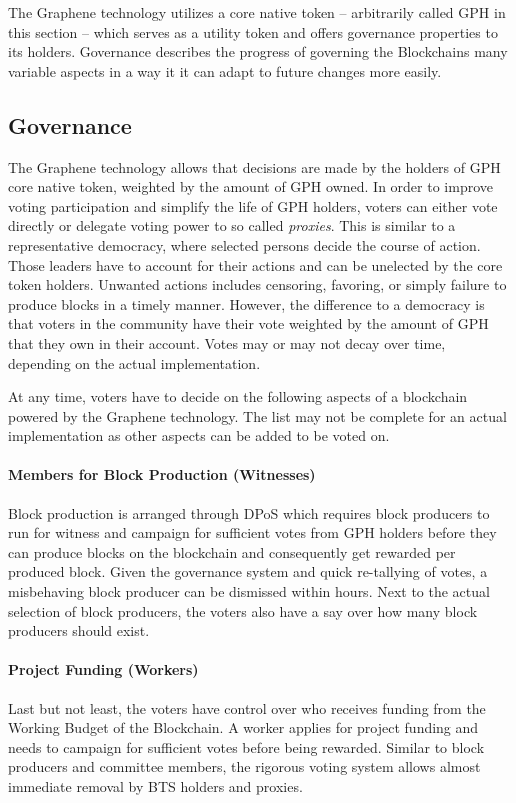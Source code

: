 The Graphene technology utilizes  a core native token -- arbitrarily called GPH in this section -- which serves as a utility token and offers governance properties to its holders. Governance describes the progress of governing the Blockchains many variable aspects in a way it it can adapt to future changes more easily.

\subsection{ Governance }
The Graphene technology allows that decisions are made by the holders of GPH core native token, weighted by the amount of GPH owned. In order to improve voting participation and simplify the life of GPH holders, voters can either vote directly or delegate voting power to so called \emph{proxies}. This is similar to a representative democracy, where selected persons decide the course of action. Those leaders have to account for their actions and can be unelected by the core token holders. Unwanted actions includes censoring, favoring, or simply failure to produce blocks in a timely manner. However, the difference to a democracy is that voters in the community have their vote weighted by the amount of GPH that they own in their account. Votes may or may not decay over time, depending on the actual implementation.

At any time, voters have to decide on the following aspects of a blockchain powered by the Graphene technology. The list may not be complete for an actual implementation as other aspects can be added to be voted on.

\paragraph{Members for Block Production (Witnesses) }
Block production is arranged through DPoS which requires block producers to run for witness and campaign for sufficient votes from GPH holders before 
they can produce blocks on the blockchain and consequently get rewarded per produced block. Given the governance system and quick re-tallying of votes, a 
misbehaving block producer can be dismissed within hours. Next to the actual selection of block producers, the voters also have a say over how many block 
producers should exist.

\paragraph{Project Funding (Workers) }
Last but not least, the voters have control over who receives funding from the Working Budget of the Blockchain. A worker applies for project funding and 
needs to campaign for sufficient votes before being rewarded. Similar to block producers and committee members, the rigorous voting system allows 
almost immediate removal by BTS holders and proxies.


